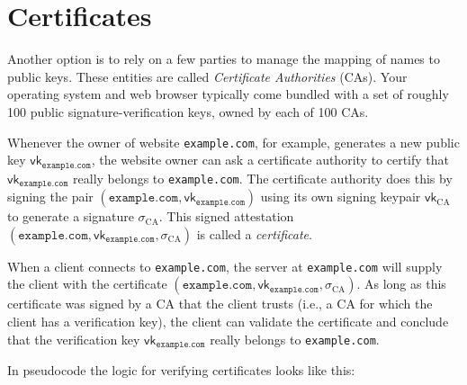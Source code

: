 \documentclass[
  letterpaper,
]{scrbook}
\newcommand{\vk}{\mathsf{vk}}
\theoremstyle{definition}
\theoremstyle{plain}
\theoremstyle{plain}
\theoremstyle{remark}
\begin{document}
\section{Certificates}\label{certificates}

Another option is to rely on a few parties to manage the mapping of
names to public keys. These entities are called \emph{Certificate
Authorities} (CAs). Your operating system and web browser typically come
bundled with a set of roughly 100 public signature-verification keys,
owned by each of 100 CAs.

Whenever the owner of website \texttt{example.com}, for example,
generates a new public key \(\vk_\mathtt{example.com}\), the website
owner can ask a certificate authority to certify that
\(\vk_\mathtt{example.com}\) really belongs to \texttt{example.com}. The
certificate authority does this by signing the pair
\((\mathtt{example.com}, \vk_\mathtt{example.com})\) using its own
signing keypair \(\vk_\text{CA}\) to generate a signature
\(\sigma_\text{CA}\). This signed attestation
\((\mathtt{example.com}, \vk_\mathtt{example.com}, \sigma_\text{CA})\)
is called a \emph{certificate}.


When a client connects to \texttt{example.com}, the server at
\texttt{example.com} will supply the client with the certificate
\((\mathtt{example.com}, \vk_\mathtt{example.com},\sigma_\text{CA})\).
As long as this certificate was signed by a CA that the client trusts
(i.e., a CA for which the client has a verification key), the client can
validate the certificate and conclude that the verification key
\(\vk_\mathtt{example.com}\) really belongs to \texttt{example.com}.

In pseudocode the logic for verifying certificates looks like this:
\end{document}
